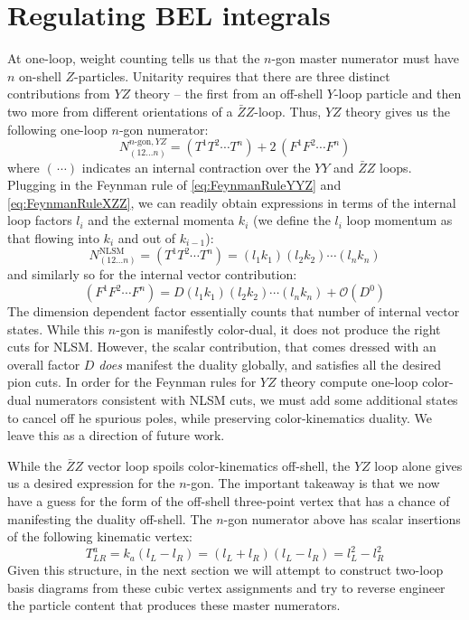 \documentclass[11pt,letter]{article}
\begin{document}
\section{Regulating BEL integrals}\label{BELreg}
At one-loop, weight counting tells us that the $n$-gon master numerator must have $n$ on-shell $Z$-particles. Unitarity requires that there are three distinct contributions from $Y\!Z$ theory -- the first from an off-shell $Y$-loop particle and then two more from different orientations of a $\bar{Z}Z$-loop.  Thus, $Y\!Z$ theory gives us the following one-loop $n$-gon numerator:
\begin{equation}
N^{n\text{-gon},YZ}_{(12...n)} = (T^{1}T^{2}\cdots T^{n})+2\, (F^1F^2\cdots F^n)
\end{equation}
where $(\,\cdots)$ indicates an internal contraction over the $YY$ and $\bar{Z}Z$ loops. Plugging in the Feynman rule of \cref{eq:FeynmanRuleYYZ} and \cref{eq:FeynmanRuleXZZ}, we can readily obtain expressions in terms of the internal loop factors $l_i$ and the external momenta $k_i$ (we define the $l_i$ loop momentum as that flowing into $k_i$ and out of $k_{i-1}$):
\begin{equation}
N_{(12...n)}^{\text{NLSM}}=(T^{1}T^{2}\cdots T^{n}) = (l_1 k_1)(l_2 k_2) \cdots (l_n k_n)
\end{equation}
and similarly so for the internal vector contribution:
\begin{equation}
 (F^1F^2\cdots F^n) = D (l_1 k_1)(l_2 k_2) \cdots (l_n k_n) + \mathcal{O}(D^0)
\end{equation}
The dimension dependent factor essentially counts that number of internal vector states. While this $n$-gon is manifestly color-dual, it does not produce the right cuts for NLSM. However, the scalar contribution, that comes dressed with an overall factor $D$ \textit{does} manifest the duality globally, and satisfies all the desired pion cuts. In order for the Feynman rules for $Y\!Z$ theory compute one-loop color-dual numerators consistent with NLSM cuts, we must add some additional states to cancel off he spurious poles, while preserving color-kinematics duality. We leave this as a direction of future work. 

While the $\bar{Z}Z$ vector loop spoils color-kinematics off-shell, the $Y\!Z$ loop alone gives us a desired expression for the $n$-gon. The important takeaway is that we now have a guess for the form of the off-shell three-point vertex that has a chance of manifesting the duality off-shell. The $n$-gon numerator above has scalar insertions of the following kinematic vertex:
\begin{equation}
T^{a}_{LR} = k_a(l_L-l_{R}) = (l_L+l_{R}) (l_L-l_{R})  = l_L^2-l_{R}^2 
\end{equation}
Given this structure, in the next section we will attempt to construct two-loop basis diagrams from these cubic vertex assignments and try to reverse engineer the particle content that produces these master numerators.
\end{document}
